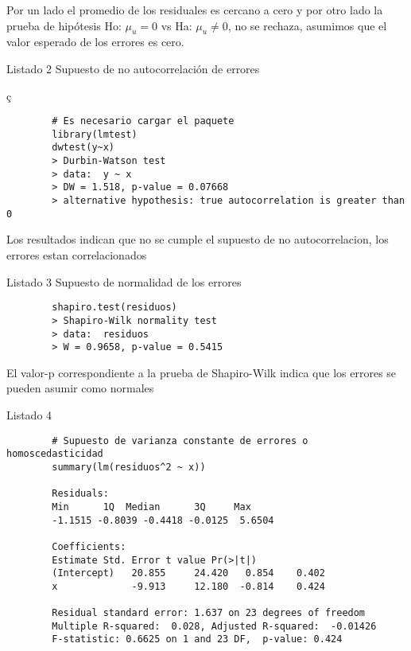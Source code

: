 \documentclass[base=hide,12pt]{elegantbook}
\begin{document}
		Por un lado el  promedio de los residuales es cercano a cero y por otro lado la prueba de hipótesis Ho: $\mu_{u}=0$ vs Ha: $\mu_{u} \neq 0$, no se rechaza, asumimos que el valor esperado de los errores es cero.
		
		
		Listado 2   Supuesto de no autocorrelación de errores \\	
		\begin{Box3}{}ç
		\begin{verbatim}
		# Es necesario cargar el paquete 
		library(lmtest)
		dwtest(y~x)
		> Durbin-Watson test
		> data:  y ~ x 
		> DW = 1.518, p-value = 0.07668
		> alternative hypothesis: true autocorrelation is greater than 0
		\end{verbatim} 
	   \end{Box3}
   
		Los resultados indican que no se cumple el supuesto de no autocorrelacion, los errores estan correlacionados
		
		
		Listado 3 Supuesto de normalidad de los errores\\
		\begin{Box3}{}
		\begin{verbatim}
		shapiro.test(residuos)
		> Shapiro-Wilk normality test
		> data:  residuos 
		> W = 0.9658, p-value = 0.5415
		\end{verbatim}
	    \end{Box3}	
		
		El valor-p correspondiente a la prueba de Shapiro-Wilk indica que los errores se pueden asumir como normales
		
		Listado 4\\	
		\begin{Box3}{}
		\begin{verbatim}
		# Supuesto de varianza constante de errores o homoscedasticidad
		summary(lm(residuos^2 ~ x))
		
		Residuals:
		Min      1Q  Median      3Q     Max 
		-1.1515 -0.8039 -0.4418 -0.0125  5.6504 
		
		Coefficients:
		Estimate Std. Error t value Pr(>|t|)
		(Intercept)   20.855     24.420   0.854    0.402
		x             -9.913     12.180  -0.814    0.424
		
		Residual standard error: 1.637 on 23 degrees of freedom
		Multiple R-squared:  0.028,	Adjusted R-squared:  -0.01426 
		F-statistic: 0.6625 on 1 and 23 DF,  p-value: 0.424
		\end{verbatim}
	  \end{Box3}
		
\end{document}
